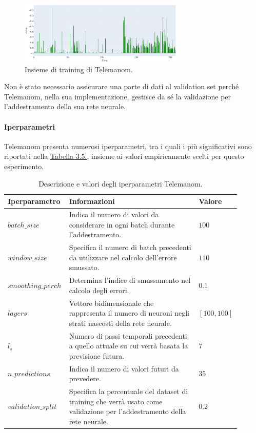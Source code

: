     \begin{figure}[H]
        \centering
        \includegraphics[width=0.7\textwidth]{./input/chapters/models/figs/telemanom-train-data.png}
        \caption{Insieme di training di Telemanom.}
        \label{fig:telemanom-train}
    \end{figure}

    Non è stato necessario assicurare una parte di dati al validation set perché Telemanom, nella sua 
    implementazione, gestisce da sé la validazione per l'addestramento della sua rete neurale.

    \paragraph{Iperparametri} Telemanom presenta numerosi iperparametri, tra i quali i più significativi sono riportati nella
    \hyperref[tab:telemanom-hyperparams]{Tabella 3.5.}, insieme ai valori empiricamente scelti per questo esperimento.
        
    \begin{table}[H]
        \centering
        \caption{Descrizione e valori degli iperparametri Telemanom.}
        \begin{tabular}{p{0.25\linewidth}p{0.55\linewidth}p{0.10\linewidth}}
            \toprule
            \textbf{Iperparametro} & \textbf{Informazioni} & \textbf{Valore}\\
            \toprule
            $batch\_size$ & Indica il numero di valori da considerare in ogni batch durante l'addestramento. & $100$\\
            \midrule
            $window\_size$ & Specifica il numero di batch precedenti da utilizzare nel calcolo dell'errore smussato.  & $110$\\
            \midrule
            $smoothing\_perch$ & Determina l'indice di smussamento nel calcolo degli errori. & $0.1$ \\
            \midrule
            $layers$ & Vettore bidimensionale che rappresenta il numero di neuroni negli strati nascosti della rete neurale. & $[100,100]$\\
            \midrule
            $l_s$ & Numero di passi temporali precedenti a quello attuale su cui verrà basata la previsione futura. & $7$ \\
            \midrule
            $n\_predictions$ & Indica il numero di valori futuri da prevedere. & $35$ \\
            \midrule
            $validation\_split$ & Specifica la percentuale del dataset di training che verrà usato come validazione per l'addestramento 
                della rete neurale. & $0.2$\\
            \bottomrule
        \end{tabular}
        \label{tab:telemanom-hyperparams}
    \end{table}


